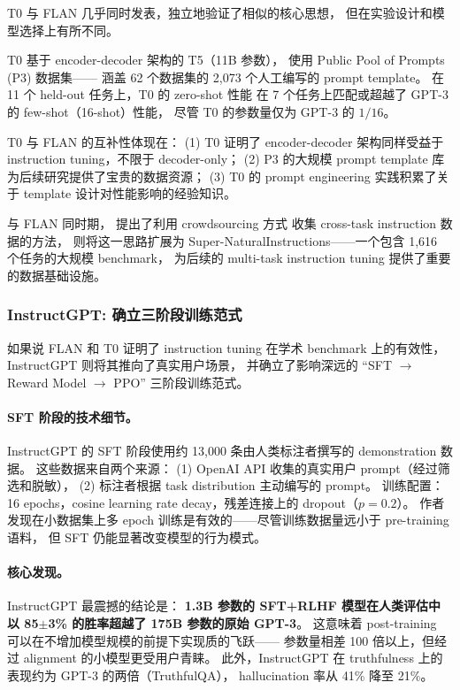 T0 与 FLAN 几乎同时发表，独立地验证了相似的核心思想，
但在实验设计和模型选择上有所不同。

T0 基于 encoder-decoder 架构的 T5（11B 参数），
使用 Public Pool of Prompts (P3) 数据集——
涵盖 62 个数据集的 2,073 个人工编写的 prompt template。
在 11 个 held-out 任务上，T0 的 zero-shot 性能
在 7 个任务上匹配或超越了 GPT-3 的 few-shot（16-shot）性能，
尽管 T0 的参数量仅为 GPT-3 的 $1/16$。

T0 与 FLAN 的互补性体现在：
(1) T0 证明了 encoder-decoder 架构同样受益于 instruction tuning，不限于 decoder-only；
(2) P3 的大规模 prompt template 库为后续研究提供了宝贵的数据资源；
(3) T0 的 prompt engineering 实践积累了关于 template 设计对性能影响的经验知识。

与 FLAN 同时期，\citet{mishra2021crossfit} 提出了利用 crowdsourcing 方式
收集 cross-task instruction 数据的方法，
\citet{wang2022supernaturalinstructions} 则将这一思路扩展为
Super-Natural\-Instructions——一个包含 1,616 个任务的大规模 benchmark，
为后续的 multi-task instruction tuning 提供了重要的数据基础设施。


\subsubsection{InstructGPT: 确立三阶段训练范式}
\label{sec:t1-instructgpt}

如果说 FLAN 和 T0 证明了 instruction tuning 在学术 benchmark 上的有效性，
InstructGPT 则将其推向了真实用户场景，
并确立了影响深远的 ``SFT $\rightarrow$ Reward Model $\rightarrow$ PPO'' 三阶段训练范式。

\paragraph{SFT 阶段的技术细节。}
InstructGPT 的 SFT 阶段使用约 13,000 条由人类标注者撰写的 demonstration 数据。
这些数据来自两个来源：
(1) OpenAI API 收集的真实用户 prompt（经过筛选和脱敏），
(2) 标注者根据 task distribution 主动编写的 prompt。
训练配置：16 epochs，cosine learning rate decay，残差连接上的 dropout（$p=0.2$）。
作者发现在小数据集上多 epoch 训练是有效的——尽管训练数据量远小于 pre-training 语料，
但 SFT 仍能显著改变模型的行为模式。

\paragraph{核心发现。}
InstructGPT 最震撼的结论是：
\textbf{1.3B 参数的 SFT+RLHF 模型在人类评估中以 85$\pm$3\% 的胜率超越了 175B 参数的原始 GPT-3}。
这意味着 post-training 可以在不增加模型规模的前提下实现质的飞跃——
参数量相差 100 倍以上，但经过 alignment 的小模型更受用户青睐。
此外，InstructGPT 在 truthfulness 上的表现约为 GPT-3 的两倍（TruthfulQA），
hallucination 率从 41\% 降至 21\%。

